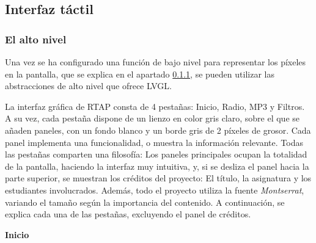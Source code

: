 \subsection{Interfaz táctil}

\subsubsection{El alto nivel}
Una vez se ha configurado una función de bajo nivel para representar los píxeles en la pantalla, que se explica en el apartado \ref{}, se pueden utilizar las abstracciones de alto nivel que ofrece LVGL. 

La interfaz gráfica de RTAP consta de 4 pestañas: Inicio, Radio, MP3 y Filtros. A su vez, cada pestaña dispone de un lienzo en color gris claro, sobre el que se añaden paneles, con un fondo blanco y un borde gris de 2 píxeles de grosor. Cada panel implementa una funcionalidad, o muestra la información relevante. Todas las pestañas comparten una filosofía: Los paneles principales ocupan la totalidad de la pantalla, haciendo la interfaz muy intuitiva, y, si se desliza el panel hacia la parte superior, se muestran los créditos del proyecto: El título, la asignatura y los estudiantes involucrados. Además, todo el proyecto utiliza la fuente \textit{Montserrat}, variando el tamaño según la importancia del contenido. A continuación, se explica cada una de las pestañas, excluyendo el panel de créditos. 

\textbf{Inicio}

